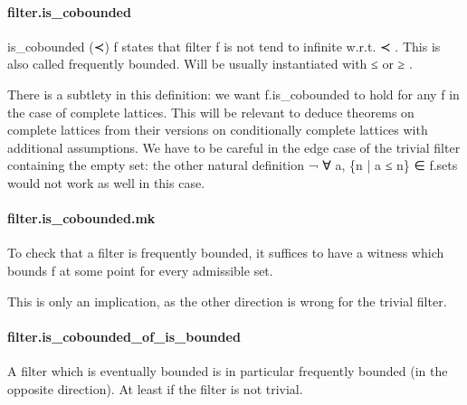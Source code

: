\documentclass{article}
\begin{document}
\paragraph{filter.is\_cobounded}
\par
\colorbox[RGB]{253,246,227}{{{{\color[RGB]{101, 123, 131} is\_cobounded (≺) f }}}} states that filter 
\colorbox[RGB]{253,246,227}{{{{\color[RGB]{101, 123, 131} f }}}} is not tend to infinite w.r.t. 
\colorbox[RGB]{253,246,227}{{{{\color[RGB]{101, 123, 131} ≺ }}}}. This is also
called frequently bounded. Will be usually instantiated with 
\colorbox[RGB]{253,246,227}{{{{\color[RGB]{181, 137, 0} ≤ }}}} or 
\colorbox[RGB]{253,246,227}{{{{\color[RGB]{181, 137, 0} ≥ }}}}.
\par
There is a subtlety in this definition: we want 
\colorbox[RGB]{253,246,227}{{{{\color[RGB]{101, 123, 131} f.is\_cobounded }}}} to hold for any 
\colorbox[RGB]{253,246,227}{{{{\color[RGB]{101, 123, 131} f }}}} in the case of
complete lattices. This will be relevant to deduce theorems on complete lattices from their
versions on conditionally complete lattices with additional assumptions. We have to be careful in
the edge case of the trivial filter containing the empty set: the other natural definition
\colorbox[RGB]{253,246,227}{{{{\color[RGB]{181, 137, 0} ¬ }}}{{{\color[RGB]{101, 123, 131}   }}}{{{\color[RGB]{133, 153, 0} ∀ }}}{{{\color[RGB]{101, 123, 131} a, \{n | a  }}}{{{\color[RGB]{181, 137, 0} ≤ }}}{{{\color[RGB]{101, 123, 131}  n\} ∈ f.sets }}}}would not work as well in this case.
\paragraph{filter.is\_cobounded.mk}
\par
To check that a filter is frequently bounded, it suffices to have a witness
which bounds 
\colorbox[RGB]{253,246,227}{{{{\color[RGB]{101, 123, 131} f }}}} at some point for every admissible set.
\par
This is only an implication, as the other direction is wrong for the trivial filter.
\paragraph{filter.is\_cobounded\_of\_is\_bounded}
\par
A filter which is eventually bounded is in particular frequently bounded (in the opposite
direction). At least if the filter is not trivial.
\end{document}
